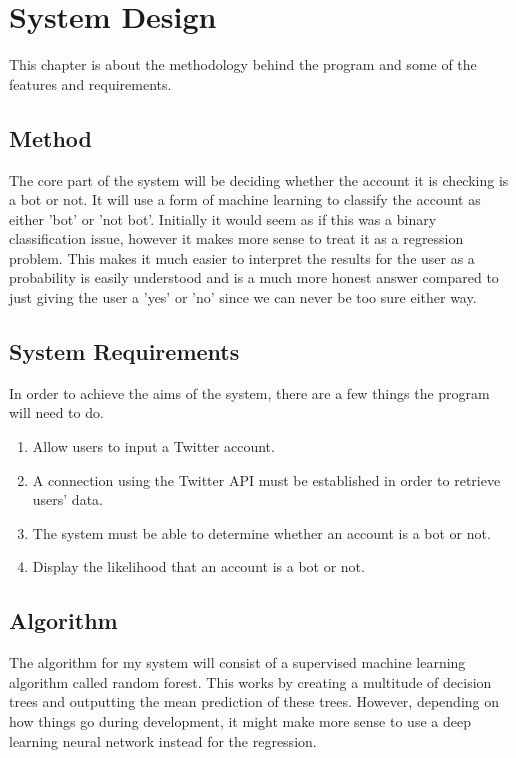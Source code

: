 
\chapter{System Design}

\label{Chapter3}
This chapter is about the methodology behind the program and some of the features and requirements.

\section{Method}
The core part of the system will be deciding whether the account it is checking is a bot or not. It will use a form of machine learning to classify the account as either 'bot' or 'not bot'. Initially it would seem as if this was a binary classification issue, however it makes more sense to treat it as a regression problem. This makes it much easier to interpret the results for the user as a probability is easily understood and is a much more honest answer compared to just giving the user a 'yes' or 'no' since we can never be too sure either way.


\section{System Requirements}
In order to achieve the aims of the system, there are a few things the program will need to do.
\begin{enumerate}
	\item Allow users to input a Twitter account.
	\item A connection using the Twitter API must be established in order to retrieve users' data.
	\item The system must be able to determine whether an account is a bot or not.
	\item Display the likelihood that an account is a bot or not.
\end{enumerate}

\section{Algorithm}
The algorithm for my system will consist of a supervised machine learning algorithm called random forest. This works by creating a multitude of decision trees and outputting the mean prediction of these trees. However, depending on how things go during development, it might make more sense to use a deep learning neural network instead for the regression. 


